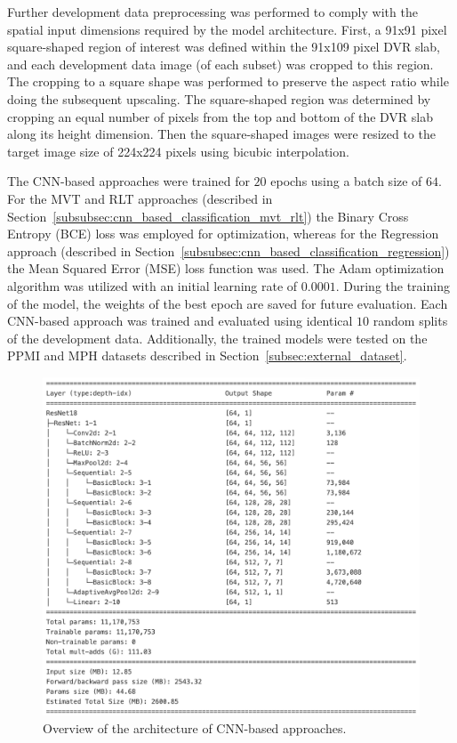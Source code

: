 Further development data preprocessing was performed to comply with the spatial input 
dimensions required by the model architecture.
First, a 91x91 pixel square-shaped region of interest was defined within the 91x109 pixel DVR slab, 
and each development data image (of each subset) was cropped to this region.
The cropping to a square shape was performed to preserve the aspect ratio while doing the subsequent upscaling.
The square-shaped region was determined by cropping an equal number of pixels from the top and bottom 
of the DVR slab along its height dimension.
Then the square-shaped images were resized to the target image size of 224x224 pixels using bicubic interpolation.

The CNN-based approaches were trained for $20$ epochs using a batch size of $64$.
For the MVT and RLT approaches (described in Section~\ref{subsubsec:cnn_based_classification_mvt_rlt}) 
the Binary Cross Entropy (BCE) loss was employed for optimization, 
whereas for the Regression approach (described in Section~\ref{subsubsec:cnn_based_classification_regression}) 
the Mean Squared Error (MSE) loss function was used.
The Adam optimization algorithm was utilized with an initial learning rate of $0.0001$.
During the training of the model, the weights of the best epoch are saved for future evaluation.
Each CNN-based approach was trained and evaluated using identical $10$ random splits of the development data.
Additionally, the trained models were tested on the PPMI and MPH datasets described in Section~\ref{subsec:external_dataset}.

\begin{figure}[t]
  \centering
  \includegraphics[width=1.0\textwidth]{content/figures/cnn_architecture.png}
  \caption{Overview of the architecture of CNN-based approaches.} 
  \label{fig:resnet}
\end{figure} 

